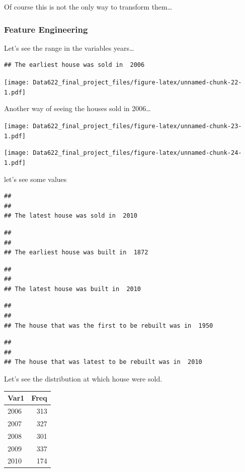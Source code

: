 \documentclass[
]{article}
\begin{document}
Of course this is not the only way to transform them\ldots{}

\hypertarget{feature-engineering}{%
\subsubsection{Feature Engineering}\label{feature-engineering}}

\vspace

Let's see the range in the variables years\ldots{}

\begin{verbatim}
## The earliest house was sold in  2006
\end{verbatim}

\texttt{[image: Data622\_final\_project\_files/figure-latex/unnamed-chunk-22-1.pdf]}

Another way of seeing the houses sold in 2006\ldots{}

\texttt{[image: Data622\_final\_project\_files/figure-latex/unnamed-chunk-23-1.pdf]}

\texttt{[image: Data622\_final\_project\_files/figure-latex/unnamed-chunk-24-1.pdf]}

let's see some values

\begin{verbatim}
## 
## 
## The latest house was sold in  2010
\end{verbatim}

\begin{verbatim}
## 
## 
## The earliest house was built in  1872
\end{verbatim}

\begin{verbatim}
## 
## 
## The latest house was built in  2010
\end{verbatim}

\begin{verbatim}
## 
## 
## The house that was the first to be rebuilt was in  1950
\end{verbatim}

\begin{verbatim}
## 
## 
## The house that was latest to be rebuilt was in  2010
\end{verbatim}

Let's see the distribution at which house were sold.

\begin{longtable}[]{@{}lr@{}}
\toprule
Var1 & Freq \\
\midrule
\endhead
2006 & 313 \\
2007 & 327 \\
2008 & 301 \\
2009 & 337 \\
2010 & 174 \\
\bottomrule
\end{longtable}
\end{document}
